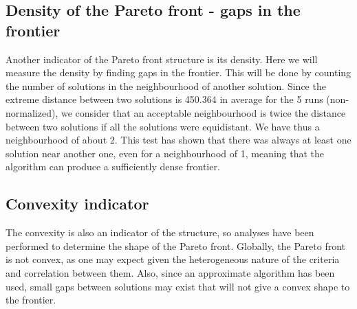 \subsection{Density of the Pareto front - gaps in the frontier}
Another indicator of the Pareto front structure is its density. Here we will measure the density by finding gaps in the frontier. This will be done by counting the number of solutions in the neighbourhood of another solution. Since the extreme distance between two solutions is 450.364 in average for the 5 runs (non-normalized), we consider that an acceptable neighbourhood is twice the distance between two solutions if all the solutions were equidistant. We have thus a neighbourhood of about 2. This test has shown that there was always at least one solution near another one, even for a neighbourhood of 1, meaning that the algorithm can produce a sufficiently dense frontier.


\subsection{Convexity indicator}
The convexity is also an indicator of the structure, so analyses have been performed to determine the shape of the Pareto front. Globally, the Pareto front is not convex, as one may expect given the heterogeneous nature of the criteria and correlation between them. Also, since an approximate algorithm has been used, small gaps between solutions may exist that will not give a convex shape to the frontier.



